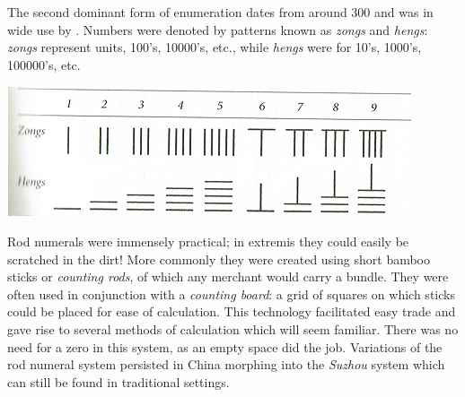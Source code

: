 The second dominant form of enumeration dates from around 300\BC{} and was in wide use by . Numbers were denoted by patterns known as \emph{zongs} and \emph{hengs}: \emph{zongs} represent units, 100's, 10000's, etc., while \emph{hengs} were for 10's, 1000's, 100000's, etc.
  \begin{center}
  	\includegraphics[angle=0.8]{ZongHeng-small.png}
  \end{center}
Rod numerals were immensely practical; in extremis they could easily be scratched in the dirt! More commonly they were created using short bamboo sticks or \emph{counting rods}, of which any merchant would carry a bundle. They were often used in conjunction with a \emph{counting board}: a grid of squares on which sticks could be placed for ease of calculation. This technology facilitated easy trade and gave rise to several methods of calculation which will seem familiar. There was no need for a zero in this system, as an empty space did the job. Variations of the rod numeral system persisted in China morphing into the \emph{Suzhou} system which can still be found in traditional settings.
\goodbreak



